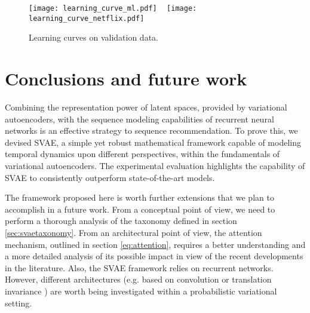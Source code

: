 \documentclass[sigconf]{acmart}
\numberwithin{equation}{section}
\begin{document}
\begin{figure}[th!]
  \centering
  \texttt{[image: learning\_curve\_ml.pdf]}
  ~
  \texttt{[image: learning\_curve\_netflix.pdf]}
  \vspace*{-4mm}
  \caption{Learning curves on validation data.}
  \label{fig:learningcurve}
\end{figure}





\section{Conclusions and future work}\label{sec:conc}







Combining the representation power of latent spaces, provided by
variational autoencoders, with the sequence modeling capabilities of
recurrent neural networks is an effective strategy to sequence
recommendation. To prove this, we devised SVAE, a simple yet robust
mathematical framework capable of modeling temporal dynamics 
upon different perspectives, within the fundamentals of variational
autoencoders. The experimental evaluation highlights the
capability of SVAE to consistently outperform state-of-the-art models.






The framework proposed here is worth further extensions
that we plan to accomplish in a future work. From a conceptual point
of view, we need to perform a thorough analysis of the taxonomy defined in section
\ref{sec:svaetaxonomy}. From an architectural point of view,
the attention mechanism, outlined in
section \ref{eq:attention}, requires a better understanding and a more
detailed analysis of its possible impact in view of the recent
developments \cite{Bahdanau14} in the literature. Also, the SVAE
framework relies on recurrent networks. However, different
architectures (e.g. based on convolution \cite{Tang:2018} or translation
invariance \cite{He:2017}) are worth being investigated within a
probabilistic variational setting.  
\end{document}
